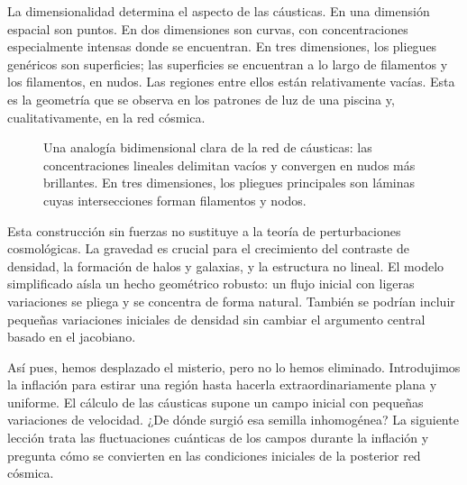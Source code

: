 La dimensionalidad determina el aspecto de las cáusticas. En una dimensión espacial son puntos. En dos dimensiones son curvas, con concentraciones especialmente intensas donde se encuentran. En tres dimensiones, los pliegues genéricos son superficies; las superficies se encuentran a lo largo de filamentos y los filamentos, en nudos. Las regiones entre ellos están relativamente vacías. Esta es la geometría que se observa en los patrones de luz de una piscina y, cualitativamente, en la red cósmica.

\begin{figure}[htbp]\centering
{}\caption{Una analogía bidimensional clara de la red de cáusticas: las concentraciones lineales delimitan vacíos y convergen en nudos más brillantes. En tres dimensiones, los pliegues principales son láminas cuyas intersecciones forman filamentos y nodos.}\label{fig:c09-caustic-network}\end{figure}

Esta construcción sin fuerzas no sustituye a la teoría de perturbaciones cosmológicas. La gravedad es crucial para el crecimiento del contraste de densidad, la formación de halos y galaxias, y la estructura no lineal. El modelo simplificado aísla un hecho geométrico robusto: un flujo inicial con ligeras variaciones se pliega y se concentra de forma natural. También se podrían incluir pequeñas variaciones iniciales de densidad sin cambiar el argumento central basado en el jacobiano.

Así pues, hemos desplazado el misterio, pero no lo hemos eliminado. Introdujimos la inflación para estirar una región hasta hacerla extraordinariamente plana y uniforme. El cálculo de las cáusticas supone un campo inicial con pequeñas variaciones de velocidad. ¿De dónde surgió esa semilla inhomogénea? La siguiente lección trata las fluctuaciones cuánticas de los campos durante la inflación y pregunta cómo se convierten en las condiciones iniciales de la posterior red cósmica.

